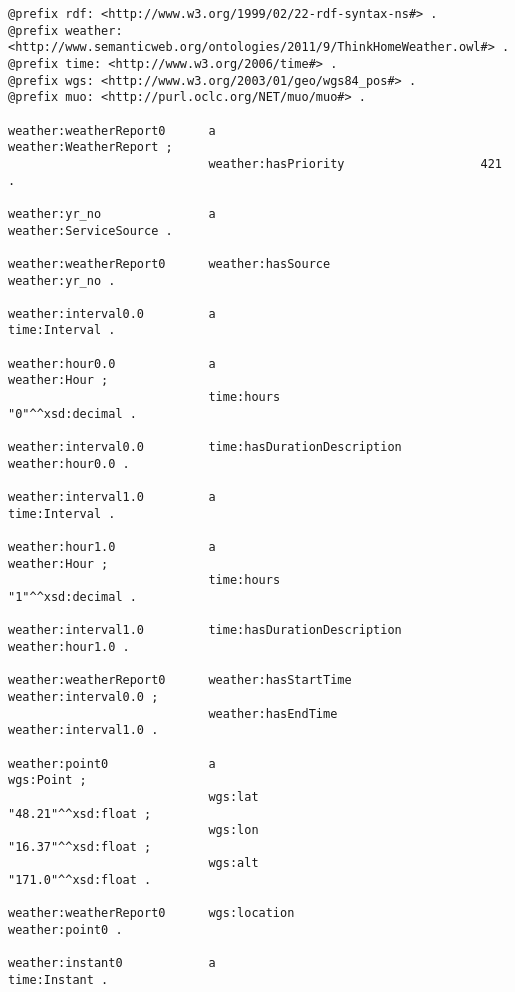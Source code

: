 \begin{lstlisting}
@prefix rdf: <http://www.w3.org/1999/02/22-rdf-syntax-ns#> .
@prefix weather: <http://www.semanticweb.org/ontologies/2011/9/ThinkHomeWeather.owl#> .
@prefix time: <http://www.w3.org/2006/time#> .
@prefix wgs: <http://www.w3.org/2003/01/geo/wgs84_pos#> .
@prefix muo: <http://purl.oclc.org/NET/muo/muo#> .

weather:weatherReport0      a                                     weather:WeatherReport ;
                            weather:hasPriority                   421 .

weather:yr_no               a                                     weather:ServiceSource .

weather:weatherReport0      weather:hasSource                     weather:yr_no .

weather:interval0.0         a                                     time:Interval .

weather:hour0.0             a                                     weather:Hour ;
                            time:hours                            "0"^^xsd:decimal .

weather:interval0.0         time:hasDurationDescription           weather:hour0.0 .

weather:interval1.0         a                                     time:Interval .

weather:hour1.0             a                                     weather:Hour ;
                            time:hours                            "1"^^xsd:decimal .

weather:interval1.0         time:hasDurationDescription           weather:hour1.0 .

weather:weatherReport0      weather:hasStartTime                  weather:interval0.0 ;
                            weather:hasEndTime                    weather:interval1.0 .

weather:point0              a                                     wgs:Point ;
                            wgs:lat                               "48.21"^^xsd:float ;
                            wgs:lon                               "16.37"^^xsd:float ;
                            wgs:alt                               "171.0"^^xsd:float .

weather:weatherReport0      wgs:location                          weather:point0 .

weather:instant0            a                                     time:Instant .


\end{lstlisting}

